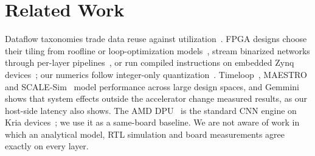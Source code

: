 \section{Related Work}\label{sec:related}
Dataflow taxonomies trade data reuse against utilization~\cite{sze2017efficient}.
FPGA designs choose their tiling from roofline or loop-optimization
models~\cite{zhang2015optimizing,ma2018optimizing}, stream binarized networks
through per-layer pipelines~\cite{umuroglu2017finn}, or run compiled
instructions on embedded Zynq devices~\cite{guo2018angeleye}; our numerics
follow integer-only quantization~\cite{jacob2018quantization}.
Timeloop~\cite{parashar2019timeloop}, MAESTRO~\cite{kwon2019maestro} and
SCALE-Sim~\cite{samajdar2020scalesim} model performance across large design
spaces, and Gemmini~\cite{genc2021gemmini} shows that system effects outside the
accelerator change measured results, as our host-side latency also shows. The AMD DPU~\cite{amd_pg338} is the standard CNN engine on
Kria devices~\cite{costa2026kv260}; we use it as a same-board baseline. We are
not aware of work in which an analytical model, RTL simulation and board
measurements agree exactly on every layer.
